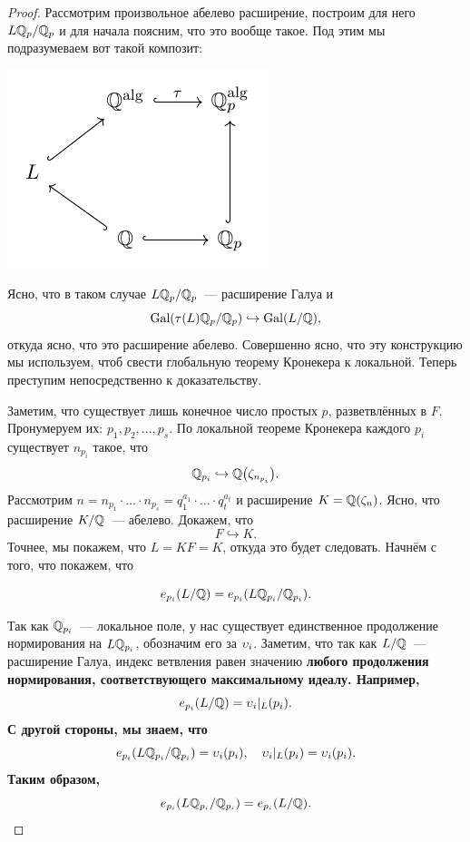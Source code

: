 	 \begin{proof}
	 	Рассмотрим произвольное абелево расширение, построим для него $L \mathbb{Q}_p / \mathbb{Q}_p$ и для начала поясним, что это вообще такое. Под этим мы подразумеваем вот такой композит: 
	 	\begin{center}
	 		\includegraphics{lectures/6/pictures/cd_47.pdf}
	 	\end{center}

	 	Ясно, что в таком случае $L \mathbb{Q}_{p}/\mathbb{Q}_{p}$~--- расширение Галуа и 
	 	\[
	 		\operatorname{Gal}(\tau(L)\mathbb{Q}_p/\mathbb{Q}_p) \hookrightarrow \operatorname{Gal}(L/\mathbb{Q}), 
	 	\]
	 	откуда ясно, что это расширение абелево. Совершенно ясно, что эту конструкцию мы используем, чтоб свести глобальную теорему Кронекера к локальной. Теперь преступим непосредственно к доказательству. 

	 	Заметим, что существует лишь конечное число простых $p$, разветвлённых в $F$. Пронумеруем их: $p_1, p_2, \ldots, p_s$. По локальной теореме Кронекера каждого $p_i$ существует $n_{p_i}$ такое, что 
	 	\[
	 		\Q_{p_i} \hookrightarrow \Q\lr*{\zeta_{n_{p_i}}}.
	 	\]
	 	Рассмотрим $n = n_{p_1} \cdot \ldots \cdot n_{p_s} = q_1^{a_1} \cdot \ldots \cdot q_t^{a_t}$ и расширение $K = \mathbb{Q}(\zeta_n)$. Ясно, что расширение $K/\mathbb{Q}$~--- абелево. Докажем, что 
	 	\[
	 		F \hookrightarrow K.
	 	\]
	 	Точнее, мы покажем, что $L = KF = K$, откуда это будет следовать. Начнём с того, что покажем, что 

	 	\[
	 		e_{p_i}\lr*{L/\Q} = e_{p_i}(L \Q_{p_i}/\Q_{p_i}).
	 	\]
	 	
	 	Так как $\mathbb{Q}_{p_i}$~--- локальное поле, у нас существует единственное продолжение нормирования на $L \mathbb{Q}_{p_i}$, обозначим его за $\upsilon_i$. Заметим, что так как $L/\mathbb{Q}$~--- расширение Галуа, индекс ветвления равен значению \bf{любого} продолжения нормирования, соответствующего максимальному идеалу. Например, 
	 	\[
	 	 	e_{p_i}(L/\mathbb{Q}) = \upsilon_i\vert_{L}(p_i).
	 	 \] 
	 	 С другой стороны, мы знаем, что 
	 	 \[
	 	 	e_{p_i}(L \mathbb{Q}_{p_i}/\mathbb{Q}_{p_i}) = \upsilon_i(p_i), \quad \upsilon_i\vert_{L}(p_i) = \upsilon_i(p_i).
	 	 \]
	 	 Таким образом, 
	 	 \[
	 	 	e_{p_i}(L \mathbb{Q}_{p_i}/\mathbb{Q}_{p_i}) = e_{p_i}(L/\mathbb{Q}). 
	 	 \]


\end{proof}
